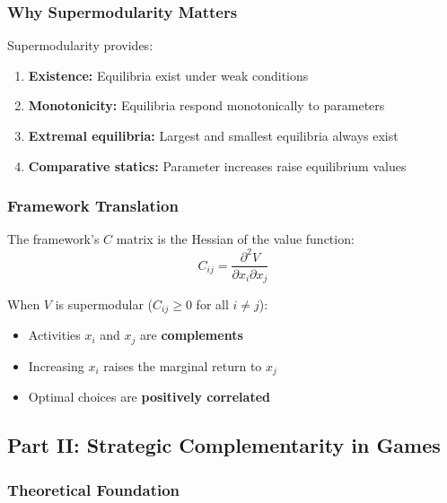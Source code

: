 \subsubsection{Why Supermodularity Matters}

Supermodularity provides:
\begin{enumerate}
    \item \textbf{Existence:} Equilibria exist under weak conditions
    \item \textbf{Monotonicity:} Equilibria respond monotonically to parameters
    \item \textbf{Extremal equilibria:} Largest and smallest equilibria always exist
    \item \textbf{Comparative statics:} Parameter increases raise equilibrium values
\end{enumerate}

\subsubsection{Framework Translation}

The framework's $C$ matrix is the Hessian of the value function:
\begin{equation}
C_{ij} = \frac{\partial^2 V}{\partial x_i \partial x_j}
\end{equation}

When $V$ is supermodular ($C_{ij} \geq 0$ for all $i \neq j$):
\begin{itemize}
    \item Activities $x_i$ and $x_j$ are \textbf{complements}
    \item Increasing $x_i$ raises the marginal return to $x_j$
    \item Optimal choices are \textbf{positively correlated}
\end{itemize}

\subsection{Part II: Strategic Complementarity in Games}

\subsubsection{Theoretical Foundation}

